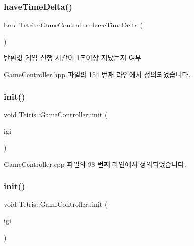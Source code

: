 \subsubsection{\texorpdfstring{have\+Time\+Delta()}{haveTimeDelta()}}
{\footnotesize\ttfamily bool Tetris\+::\+Game\+Controller\+::have\+Time\+Delta (\begin{DoxyParamCaption}{ }\end{DoxyParamCaption})\hspace{0.3cm}{\ttfamily [inline]}}

\begin{DoxyReturn}{반환값}
게임 진행 시간이 1초이상 지났는지 여부 
\end{DoxyReturn}


Game\+Controller.\+hpp 파일의 154 번째 라인에서 정의되었습니다.

\mbox{\label{class_tetris_1_1_game_controller_a9c0f88f11b8b75063e63bcbc621dc0be}} 
\subsubsection{\texorpdfstring{init()}{init()}\hspace{0.1cm}{\footnotesize\ttfamily [1/2]}}
{\footnotesize\ttfamily void Tetris\+::\+Game\+Controller\+::init (\begin{DoxyParamCaption}\item[{\hyperlink{class_tetris_1_1_init_game_info}{Init\+Game\+Info} $\ast$}]{igi }\end{DoxyParamCaption})}



Game\+Controller.\+cpp 파일의 98 번째 라인에서 정의되었습니다.

\mbox{\label{class_tetris_1_1_game_controller_a9c0f88f11b8b75063e63bcbc621dc0be}} 
\subsubsection{\texorpdfstring{init()}{init()}\hspace{0.1cm}{\footnotesize\ttfamily [2/2]}}
{\footnotesize\ttfamily void Tetris\+::\+Game\+Controller\+::init (\begin{DoxyParamCaption}\item[{\hyperlink{class_tetris_1_1_init_game_info}{Init\+Game\+Info} $\ast$}]{igi }\end{DoxyParamCaption})\hspace{0.3cm}{\ttfamily [inline]}}



